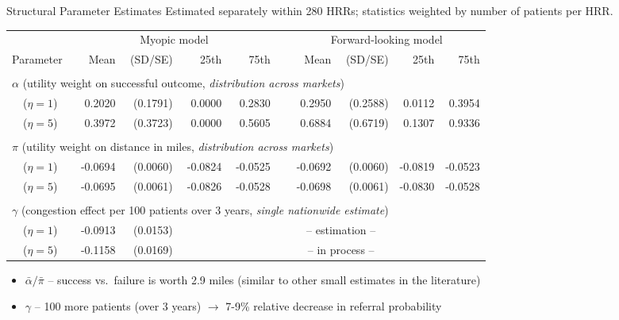 \documentclass[slides, aspectratio=169]{beamer}
\begin{document}
\begin{frame}{Structural Parameter Estimates} 
{Estimated separately within 280 HRRs; statistics weighted by number of patients per HRR.}

\footnotesize \pause

\begin{center}
\begin{tabular}{lrrrrrrrrr}
\hline
 & \multicolumn{4}{c}{Myopic model} & & \multicolumn{4}{c}{Forward-looking model}\\
 \cline{2-5} \cline{7-10}
Parameter & Mean & (SD/SE) & 25th & 75th & & Mean & (SD/SE) & 25th & 75th \\ 
\hline
\\
\multicolumn{8}{l}{$\alpha$ \color{gray} (utility weight on successful outcome, \emph{distribution across markets})} \\ 
\ \ ($\eta=1$) & 0.2020 & (0.1791) & 0.0000 & 0.2830 & & 0.2950 & (0.2588) & 0.0112 & 0.3954 \\ 
\ \ ($\eta=5$) & 0.3972 & (0.3723) & 0.0000 & 0.5605 & & 0.6884 & (0.6719) & 0.1307 & 0.9336 \\ 
\\
\multicolumn{8}{l}{$\pi$ \color{gray} (utility weight on distance in miles, \emph{distribution across markets})} \\ 
\ \ ($\eta=1$) & -0.0694 & (0.0060) & -0.0824  & -0.0525 & & -0.0692 & (0.0060) & -0.0819 & -0.0523 \\ 
\ \ ($\eta=5$) & -0.0695 & (0.0061) & -0.0826  & -0.0528 & & -0.0698 & (0.0061) & -0.0830 & -0.0528 \\ 
\\ 
\multicolumn{8}{l}{$\gamma$ \color{gray} (congestion effect per 100 patients over 3 years, \emph{single nationwide estimate})} \\  
\ \ ($\eta=1$) & -0.0913 & (0.0153) & & & & \multicolumn{2}{c}{\color{gray} -- estimation --} \\ 
\ \ ($\eta=5$) & -0.1158 & (0.0169) & & & & \multicolumn{2}{c}{\color{gray} -- in process --} \\ 

\hline
\end{tabular}
\end{center}

\medskip \pause

\begin{itemize}
    \item $\bar \alpha / \bar \pi$ -- success vs.~failure is worth 2.9 miles
    (similar to other small estimates in the literature)
    \item $\gamma$ -- 100 more patients (over 3 years) $\rightarrow$ 7-9\% relative decrease in referral probability
\end{itemize}

\end{frame}
\end{document}
